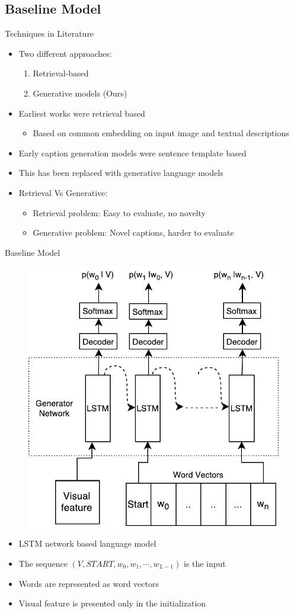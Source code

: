 \documentclass{beamer}
\begin{document}
\subsection{Baseline Model}
\begin{frame}{Techniques in Literature}
\begin{itemize}
  \item Two different approaches:
      \begin{enumerate}
        \item Retrieval-based 
        \item Generative models (Ours)
      \end{enumerate}
  \item<2-> Earliest works were retrieval based~\cite{Farhadi2010, Hodosh2013, Karpathy2014}
          {\begin{itemize}
          \item Based on common embedding on input image and textual descriptions  
      \end{itemize}}
  \item<3-> Early caption generation models were sentence template based
  \item<4-> This has been replaced with generative language models 
  \item<5-> Retrieval Vs Generative: 
      \begin{itemize}
        \item Retrieval problem: Easy to evaluate, no novelty 
        \item Generative problem: Novel captions, harder to evaluate
      \end{itemize}
\end{itemize} 
\end{frame}
\begin{frame}{Baseline Model}
    \begin{figure}[h]
        \centering
        \includegraphics[width=0.4\linewidth]{images/Thesis_lstmLangGen.pdf}
    \end{figure}
    \begin{itemize}
        \item LSTM network based language model
        \item The sequence $(V,START,w_0, w_1, \cdots,w_{L-1})$ is the input
        \item Words are represented as word vectors 
        \item Visual feature is presented only in the initialization 
    \end{itemize}
\end{frame}
\end{document}
